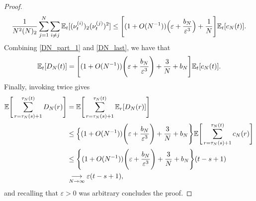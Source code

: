 \begin{proof}
\begin{equation}
\frac{ 1 }{ N^2 ( N )_2 } \sum_{ j=1 }^N \sum_{ i \neq j } 
        \mathbb{E}_t[ ( \nu_t^{(i)} )_2 ( \nu_t^{(j)} )^2 ] 
\leq \Bigg[ ( 1 + O( N^{ -1 } ) )
        \Big( \varepsilon + \frac{ b_N }{ \varepsilon^3 } \Big) 
        + \frac{ 1 }{ N } \Bigg] \mathbb{E}_t[ c_N( t ) ]. \label{DN_last}
\end{equation}
Combining \eqref{DN_part_1} and \eqref{DN_last}, we have that
\begin{equation*}
\mathbb{E}_t[ D_N(t) ] 
= \Bigg[ (1 + O( N^{ -1 } )) \Bigg( \varepsilon + \frac{ b_N }{ \varepsilon^3 } \Bigg) 
        + \frac{ 3 }{ N } + b_N \Bigg] \mathbb{E}_t[ c_N(t) ] .
\end{equation*}
Finally, invoking \textcite[Lemma 2]{koskela2018} twice gives
\begin{align*}
\mathbb{E}\Bigg[ \sum_{ r = \tau_N( s ) + 1 }^{ \tau_N( t ) } D_N( r ) \Bigg] 
&= \mathbb{E}\Bigg[ \sum_{ r = \tau_N( s ) + 1 }^{ \tau_N( t ) } \mathbb{E}_r[ D_N( r ) ] \Bigg] \\
&\leq \Big\{ (1 + O( N^{ -1 } )) 
        \Bigg( \varepsilon + \frac{ b_N }{ \varepsilon^3 } \Bigg) 
        + \frac{ 3 }{ N } + b_N \Bigg\}
        \mathbb{E}\Bigg[ \sum_{ r = \tau_N( s ) + 1 }^{ \tau_N( t ) } c_N( r ) \Bigg] \\
&\leq \Bigg\{ (1 + O( N^{ -1 } )) 
        \Bigg( \varepsilon + \frac{ b_N }{ \varepsilon^3 } \Bigg) 
        + \frac{ 3 }{ N } + b_N \Bigg\} ( t - s + 1 ) \\
& \underset{N\to\infty}{\longrightarrow} \varepsilon ( t - s + 1 ),
\end{align*}
and recalling that $\varepsilon > 0$ was arbitrary concludes the proof.
\end{proof}

